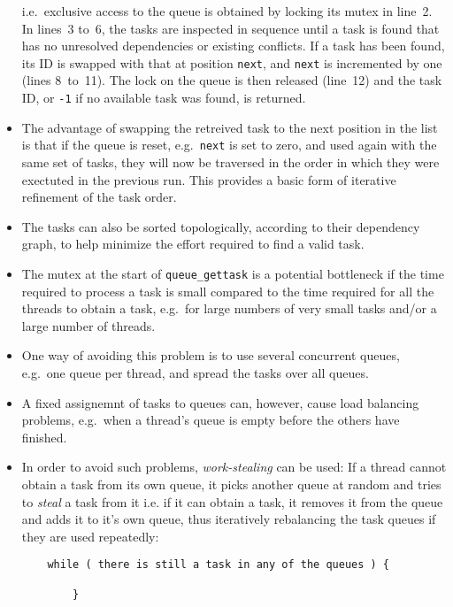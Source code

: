 \documentclass[final]{siamltex}
\begin{document}
\begin{itemize}
    \noindent i.e.~exclusive access to the queue is obtained by locking
        its mutex in line~2. In lines~3 to~6, the tasks are inspected
        in sequence until a task is found that has no unresolved
        dependencies or existing conflicts.
        If a task has been found, its ID is swapped with that at
        position {\tt next}, and {\tt next} is incremented by one
        (lines 8~to~11).
        The lock on the queue is then released (line~12) and
        the task ID, or {\tt -1} if no available task was found, is
        returned.
        
    \item The advantage of swapping the retreived task to the next
        position in the list is that if the queue is reset, e.g.~{\tt next}
        is set to zero, and used again with the same set of tasks,
        they will now be traversed in the order in which they were
        exectuted in the previous run.
        This provides a basic form of iterative refinement of the task
        order.
        
    \item The tasks can also be sorted topologically, according to their
        dependency graph, to help minimize the effort required to find
        a valid task.
        
    \item The mutex at the start of {\tt queue\_gettask} is a potential
        bottleneck if the time required to process a task is small
        compared to the time required for all the threads to obtain
        a task, e.g.~for large numbers of very small tasks and/or
        a large number of threads.
        
    \item One way of avoiding this problem is to use several concurrent
        queues, e.g.~one queue per thread, and spread the tasks over
        all queues.
        
    \item A fixed assignemnt of tasks to queues can, however,
        cause load balancing problems, e.g.~when a thread's queue is
        empty before the others have finished.
        
    \item In order to avoid such problems, {\em work-stealing} can be used:
        If a thread cannot obtain a task from its own queue, it picks
        another queue at random and tries to {\em steal} a task from it
        i.e. if it can obtain a task, it removes it from the queue and
        adds it to it's own queue, thus iteratively rebalancing
        the task queues if they are used repeatedly:

\begin{center}\begin{minipage}{0.8\textwidth}
    \begin{lstlisting}
    while ( there is still a task in any of the queues ) {
        
        }
    \end{lstlisting}
\end{minipage}\end{center}

\end{itemize}
\end{document}
